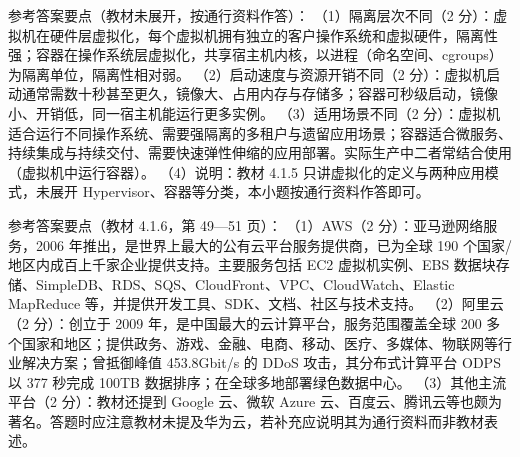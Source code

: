\documentclass[a4paper,11pt]{article}
\begin{document}
\q 参考答案要点（教材未展开，按通行资料作答）：
（1）隔离层次不同（2 分）：虚拟机在硬件层虚拟化，每个虚拟机拥有独立的客户操作系统和虚拟硬件，隔离性强；容器在操作系统层虚拟化，共享宿主机内核，以进程（命名空间、cgroups）为隔离单位，隔离性相对弱。
（2）启动速度与资源开销不同（2 分）：虚拟机启动通常需数十秒甚至更久，镜像大、占用内存与存储多；容器可秒级启动，镜像小、开销低，同一宿主机能运行更多实例。
（3）适用场景不同（2 分）：虚拟机适合运行不同操作系统、需要强隔离的多租户与遗留应用场景；容器适合微服务、持续集成与持续交付、需要快速弹性伸缩的应用部署。实际生产中二者常结合使用（虚拟机中运行容器）。
（4）说明：教材 4.1.5 只讲虚拟化的定义与两种应用模式，未展开 Hypervisor、容器等分类，本小题按通行资料作答即可。

\q 参考答案要点（教材 4.1.6，第 49—51 页）：
（1）AWS（2 分）：亚马逊网络服务，2006 年推出，是世界上最大的公有云平台服务提供商，已为全球 190 个国家/地区内成百上千家企业提供支持。主要服务包括 EC2 虚拟机实例、EBS 数据块存储、SimpleDB、RDS、SQS、CloudFront、VPC、CloudWatch、Elastic MapReduce 等，并提供开发工具、SDK、文档、社区与技术支持。
（2）阿里云（2 分）：创立于 2009 年，是中国最大的云计算平台，服务范围覆盖全球 200 多个国家和地区；提供政务、游戏、金融、电商、移动、医疗、多媒体、物联网等行业解决方案；曾抵御峰值 453.8Gbit/s 的 DDoS 攻击，其分布式计算平台 ODPS 以 377 秒完成 100TB 数据排序；在全球多地部署绿色数据中心。
（3）其他主流平台（2 分）：教材还提到 Google 云、微软 Azure 云、百度云、腾讯云等也颇为著名。答题时应注意教材未提及华为云，若补充应说明其为通行资料而非教材表述。

\end{document}
